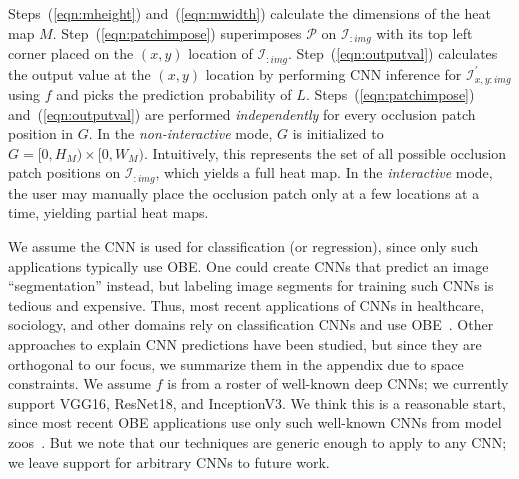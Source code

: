 Steps~(\ref{eqn:mheight}) and~(\ref{eqn:mwidth}) calculate the dimensions of the heat map $M$.
Step~(\ref{eqn:patchimpose}) superimposes $\mathcal{P}$ on $\mathcal{I}_{:img}$ with its top left corner placed on the $(x,y)$ location of $\mathcal{I}_{:img}$.
Step~(\ref{eqn:outputval}) calculates the output value at the $(x,y)$ location by performing CNN inference for $\mathcal{I}^{'}_{x,y:img}$ using $f$ and picks the prediction probability of $L$.
Steps~(\ref{eqn:patchimpose}) and~(\ref{eqn:outputval}) are performed \textit{independently} for every occlusion patch position in $G$.
In the \textit{non-interactive} mode, $G$ is initialized to $G = [0, H_M) \times [0, W_M)$. Intuitively, this represents the set of all possible occlusion patch positions on $\mathcal{I}_{:img}$, which yields a full heat map. In the \textit{interactive} mode, the user may manually place the occlusion patch only at a few locations at a time, yielding partial heat maps.

We assume the CNN is used for classification (or regression), since only such applications typically use OBE. One could create CNNs that predict an image ``segmentation'' instead, but labeling image segments for training such CNNs is tedious and expensive. Thus, most recent applications of CNNs in healthcare, sociology, and other domains rely on classification CNNs and use OBE~\cite{kermany2018identifying, islam2017abnormality, mohanty2016using, arbabzadah2016identifying, wang2017deep}. Other approaches to explain CNN predictions have been studied, but since they are orthogonal to our focus, we summarize them in the appendix due to space constraints.
We assume $f$ is from a roster of well-known deep CNNs; we currently support VGG16, ResNet18, and InceptionV3. We think this is a reasonable start, since most recent OBE applications use only such well-known CNNs from model zoos~\cite{caffemodelzoo, tfmodelzoo}. But we note that our techniques are generic enough to apply to any CNN; we leave support for arbitrary CNNs to future work.


